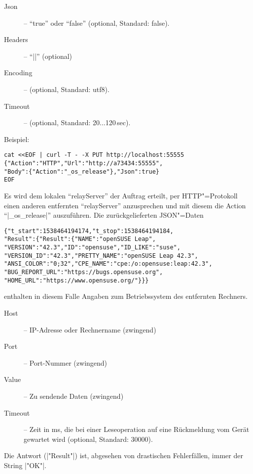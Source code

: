\documentclass[titlepage=false,toc=nobibliography]{vl-report}
\newcommand*\theServer{relayServer}
\newcommand*\action[1]{\fbox{\nolinkurl{#1}}\medskip\par}
\begin{document}
\begin{description}
\begin{description}
\begin{description}
        \item[Json] -- "`true"' oder "`false"' (optional, Standard: false).
        \item[Headers] -- "`|{}|"' (optional)
        \item[Encoding] -- (optional, Standard: utf8).
        \item[Timeout] -- (optional, Standard: 20...120\,sec).

      \end{description}
Beispiel:
\begin{lstlisting}[language={}]
cat <<EOF | curl -T - -X PUT http://localhost:55555
{"Action":"HTTP","Url":"http://a73434:55555",
"Body":{"Action":"_os_release"},"Json":true}
EOF
\end{lstlisting}
Es wird dem lokalen "`\theServer"' der Auftrag erteilt, per HTTP"=Protokoll 
einen anderen entfernten "`\theServer"' anzusprechen und mit diesem die Action  
"`|_os_release|"' auszuführen. Die zurückgelieferten JSON"=Daten
\begin{lstlisting}[language={}]
{"t_start":1538464194174,"t_stop":1538464194184,
"Result":{"Result":{"NAME":"openSUSE Leap",
"VERSION":"42.3","ID":"opensuse","ID_LIKE":"suse",
"VERSION_ID":"42.3","PRETTY_NAME":"openSUSE Leap 42.3",
"ANSI_COLOR":"0;32","CPE_NAME":"cpe:/o:opensuse:leap:42.3",
"BUG_REPORT_URL":"https://bugs.opensuse.org",
"HOME_URL":"https://www.opensuse.org/"}}}
\end{lstlisting}
enthalten in diesem Falle Angaben zum Betriebssystem des entfernten Rechners.

    \item \action{UDP}

      \begin{description}

        \item[Host] -- IP-Adresse oder Rechnername (zwingend)

        \item[Port] -- Port-Nummer (zwingend)

        \item[Value] -- Zu sendende Daten (zwingend)
        
        \item[Timeout] -- Zeit in ms, die bei einer Leseoperation auf eine
        Rückmeldung vom Gerät gewartet wird (optional, Standard: 30000).

      \end{description}

      \noindent Die Antwort (|"Result"|) ist, abgesehen von drastischen
      Fehlerfällen, immer der String |"OK"|.


\end{description}
\end{description}
\end{document}

